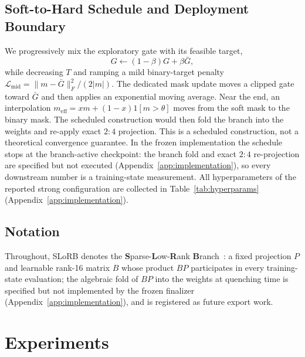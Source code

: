 \documentclass{article}
\begin{document}
\subsection{Soft-to-Hard Schedule and Deployment Boundary}
We progressively mix the exploratory gate with its feasible target,
\begin{equation}
G\leftarrow(1-\beta)G+\beta\bar G,
\end{equation}
while decreasing $T$ and ramping a mild binary-target penalty $\mathcal{L}_{\mathrm{mid}}=\lVert m-\bar G\rVert_F^2/(2|m|)$. The dedicated mask update moves a clipped gate toward $\bar G$ and then applies an exponential moving average. Near the end, an interpolation $m_{\mathrm{eff}}=xm+(1-x)\mathrm{1}[m>\theta]$ moves from the soft mask to the binary mask. The scheduled construction would then fold the branch into the weights and re-apply exact $2{:}4$ projection. This is a scheduled construction, not a theoretical convergence guarantee. In the frozen implementation the schedule stops at the branch-active checkpoint: the branch fold and exact $2{:}4$ re-projection are specified but not executed (Appendix~\ref{app:implementation}), so every downstream number is a training-state measurement.
All hyperparameters of the reported strong configuration are collected in
Table~\ref{tab:hyperparams} (Appendix~\ref{app:implementation}).

\subsection{Notation}
Throughout, SLoRB denotes the \textbf{S}parse-\textbf{L}ow-\textbf{R}ank
\textbf{B}ranch~\citep{huang2025ast}: a fixed projection $P$ and learnable
rank-16 matrix $B$ whose product $B P$ participates in every training-state
evaluation; the algebraic fold of $B P$ into the weights at quenching time is
specified but not implemented by the frozen finalizer (Appendix~\ref{app:implementation}),
and is registered as future export work.

\section{Experiments}
\end{document}
